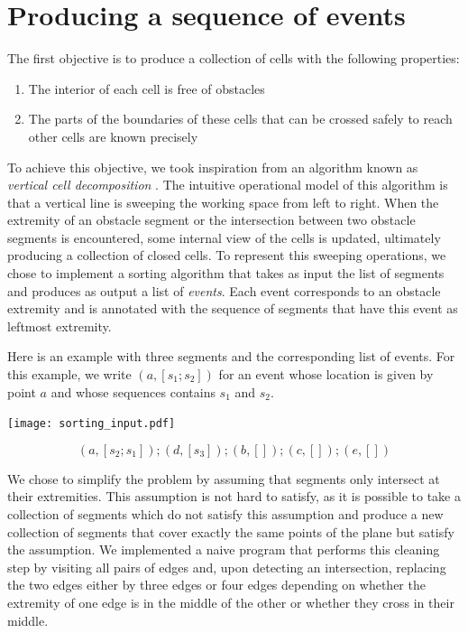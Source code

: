 \documentclass{llncs}
\begin{document}
\section{Producing a sequence of events}
The first objective is to produce a collection of cells with the following
properties:
\begin{enumerate}
\item The interior of each cell is free of obstacles
\item The parts of the boundaries of these cells that can be crossed
  safely to reach other cells are known precisely
\end{enumerate}
To achieve this objective, we took inspiration from an algorithm known as
{\em vertical cell decomposition} \cite{Latombe91}.  The intuitive
operational model of this algorithm is that a vertical line is
sweeping the working space from left to right.  When the extremity of
an obstacle segment or the intersection between two obstacle segments
is encountered, some internal view of the cells is updated, ultimately
producing a collection of closed cells.  To represent this sweeping
operations, we chose to implement a sorting algorithm that takes as
input the list of segments and produces as output a list of {\em
  events}.  Each event corresponds to an obstacle extremity and is
annotated with the sequence of segments that have this event as
leftmost extremity.

Here is an example with three segments and the corresponding list of events.
For this example, we write \((a, [s_1;s_2])\) for an event whose location is
given by point \(a\) and whose sequences contains \(s_1\) and \(s_2\).

\begin{center}
\texttt{[image: sorting\_input.pdf]}
\end{center}
\[ (a, [s_2; s_1]); (d, [s_3]); (b, []); (c, []); (e,[])\]

We chose to simplify the problem by assuming that segments only
intersect at their extremities.  This assumption is not hard to
satisfy, as it is possible to take a collection of segments which do
not satisfy this assumption and produce a new collection of segments
that cover exactly the same points of the plane but satisfy the
assumption.  We implemented a naive program that performs this cleaning
step by visiting all pairs of edges and, upon detecting an
intersection, replacing the two edges either by three edges or four
edges depending on whether the extremity of one edge is in the middle
of the other or whether they cross in their middle.
\end{document}
